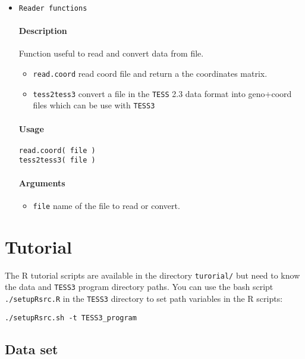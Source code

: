 \documentclass[10pt,a4paper]{article}
\begin{document}
\begin{itemize}
\begin{itemize}
\end{itemize}

\item \verb|Reader functions|

\paragraph{Description}
Function useful to read and convert data from file.

\begin{itemize}
  \item[] \verb|read.coord| read coord file and return a the coordinates matrix.
  \item[] \verb|tess2tess3| convert a file in the {\tt TESS} 2.3 data format into geno+coord files which can be use with {\tt TESS3}
\end{itemize}

\paragraph{Usage}
\begin{verbatim}
read.coord( file )
tess2tess3( file )
\end{verbatim}
\paragraph{Arguments}
\begin{itemize}
\item \verb|file| name of the file to read or convert.
\end{itemize}


\end{itemize}





\section{Tutorial}

The R tutorial scripts are available in the directory \verb|turorial/| but need to know the data and {\tt TESS3} program directory paths. You can use the bash script \verb|./setupRsrc.R| in the {\tt TESS3} directory to set path variables in the R scripts:
\begin{Verbatim}[frame=single]
./setupRsrc.sh -t TESS3_program
\end{Verbatim}

\subsection{Data set}
\end{document}
